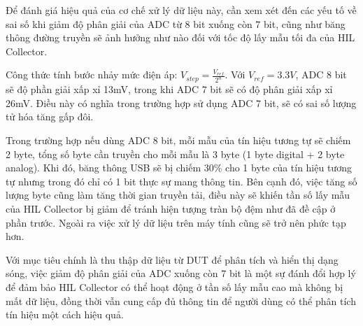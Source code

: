 Để đánh giá hiệu quả của cơ chế xử lý dữ liệu này, cần xem xét đến các yếu tố về sai số khi giảm độ phân giải của ADC từ 8 bit xuống còn 7 bit, cũng như băng thông đường truyền sẽ ảnh hưởng như nào đối với tốc độ lấy mẫu tối đa của HIL Collector.

Công thức tính bước nhảy mức điện áp: $V_{step} = \frac{V_{ref}}{2^n}$. Với $V_{ref} = 3.3V$, ADC 8 bit sẽ độ phần giải xấp xỉ 13mV, trong khi ADC 7 bit sẽ có độ phân giải xấp xỉ 26mV.
Điều này có nghĩa trong trường hợp sử dụng ADC 7 bit, sẽ có sai số lượng tử hóa tăng gấp đôi.

Trong trường hợp nếu dùng ADC 8 bit, mỗi mẫu của tín hiệu tương tự sẽ chiếm 2 byte, tổng số byte cần truyền cho mỗi mẫu là 3 byte (1 byte digital + 2 byte analog).
Khi đó, băng thông USB sẽ bị chiếm 30\% cho 1 byte của tín hiệu tương tự nhưng trong đó chỉ có 1 bit thực sự mang thông tin.
Bên cạnh đó, việc tăng số lượng byte cũng làm tăng thời gian truyền tải, điều này sẽ khiến tần số lấy mẫu của HIL Collector bị giảm để tránh hiện tượng tràn bộ đệm như đã đề cập ở phần trước.
Ngoài ra việc xử lý dữ liệu trên máy tính cũng sẽ trở nên phức tạp hơn.

Với mục tiêu chính là thu thập dữ liệu từ DUT để phân tích và hiển thị dạng sóng, việc giảm độ phân giải của ADC xuống còn 7 bit là một sự đánh đổi hợp lý để đảm bảo HIL Collector có thể hoạt động ở tần số lấy mẫu cao mà không bị mất dữ liệu, đồng thời vẫn cung cấp đủ thông tin để người dùng có thể phân tích tín hiệu một cách hiệu quả.

